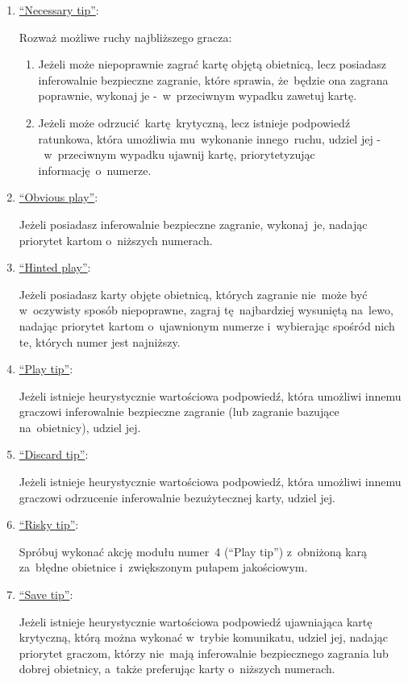 \documentclass[declaration,shortabstract,inz]{iithesis}
\begin{document}
\begin{enumerate}
	\item \underline{``Necessary tip''}:

	Rozważ możliwe ruchy najbliższego gracza:
	\begin{enumerate}
		\item Jeżeli może niepoprawnie zagrać kartę objętą obietnicą, lecz posiadasz inferowalnie bezpieczne zagranie, które sprawia, że~będzie ona zagrana poprawnie, wykonaj je -~w~przeciwnym wypadku zawetuj kartę.
		\item Jeżeli może odrzucić kartę krytyczną, lecz istnieje podpowiedź ratunkowa, która umożliwia mu~wykonanie innego ruchu, udziel jej -~w~przeciwnym wypadku ujawnij kartę, priorytetyzując informację o~numerze.
	\end{enumerate}

	\item \underline{``Obvious play''}:
	
	Jeżeli posiadasz inferowalnie bezpieczne zagranie, wykonaj~je, nadając priorytet kartom o~niższych numerach.
	
	\item \underline{``Hinted play''}:

	Jeżeli posiadasz karty objęte obietnicą, których zagranie nie~może być w~oczywisty sposób niepoprawne, zagraj tę~najbardziej wysuniętą na~lewo, nadając priorytet kartom o~ujawnionym numerze i~wybierając spośród nich te, których numer jest najniższy.

	\item \underline{``Play tip''}:
	
	Jeżeli istnieje heurystycznie wartościowa podpowiedź, która umożliwi innemu graczowi inferowalnie bezpieczne zagranie (lub zagranie bazujące na~obietnicy), udziel jej.

	\item \underline{``Discard tip''}:
	
	Jeżeli istnieje heurystycznie wartościowa podpowiedź, która umożliwi innemu graczowi odrzucenie inferowalnie bezużytecznej karty, udziel jej.

	\item \underline{``Risky tip''}:
	
	Spróbuj wykonać akcję modułu numer~4 (``Play tip'') z~obniżoną karą za~błędne obietnice i~zwiększonym pułapem jakościowym.
	
	\item \underline{``Save tip''}:
	
	Jeżeli istnieje heurystycznie wartościowa podpowiedź ujawniająca kartę krytyczną, którą można wykonać w~trybie komunikatu, udziel jej, nadając priorytet graczom, którzy nie~mają inferowalnie bezpiecznego zagrania lub dobrej obietnicy, a~także preferując karty o~niższych numerach.
	

\end{enumerate}
\end{document}
